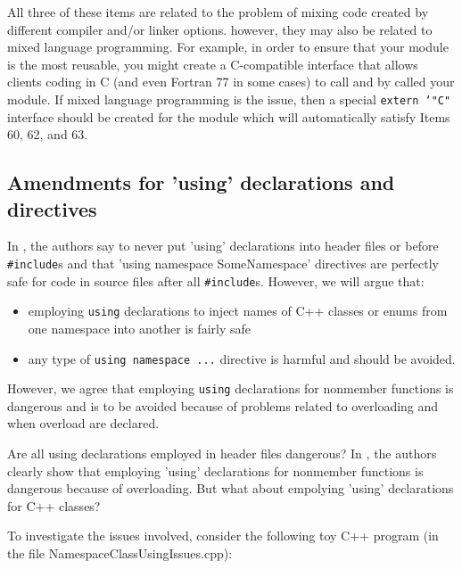 All three of these items are related to the problem of mixing code created by
different compiler and/or linker options.  however, they may also be related
to mixed language programming.  For example, in order to ensure that your
module is the most reusable, you might create a C-compatible interface that
allows clients coding in C (and even Fortran 77 in some cases) to call and by
called your module.  If mixed language programming is the issue, then a
special {}\texttt{extern `"C"} interface should be created for the module
which will automatically satisfy Items 60, 62, and 63.

%
\subsection{Amendments for 'using' declarations and directives}
%

In {}\cite[Item 59]{C++CodingStandards05}, the authors say to never put
'using' declarations into header files or before {}\texttt{\#include}s and
that 'using namespace SomeNamespace' directives are perfectly safe for code in
source files after all {}\texttt{\#include}s.  However, we will argue that:

\begin{itemize}

{}\item{}employing {}\texttt{using} declarations to inject names of C++
classes or enums from one namespace into another is fairly safe

{}\item{}any type of {}\texttt{using namespace ...} directive is harmful and
should be avoided.

\end{itemize}

{}\noindent{}However, we agree that employing {}\texttt{using} declarations
for nonmember functions is dangerous and is to be avoided because of problems
related to overloading and when overload are declared.

Are all using declarations employed in header files dangerous?  In
{}\cite[Item 59]{C++CodingStandards05}, the authors clearly show that
employing 'using' declarations for nonmember functions is dangerous because of
overloading.  But what about empolying 'using' declarations for C++ classes?

To investigate the issues involved, consider the following toy C++ program (in
the file NamespaceClassUsingIssues.cpp):

